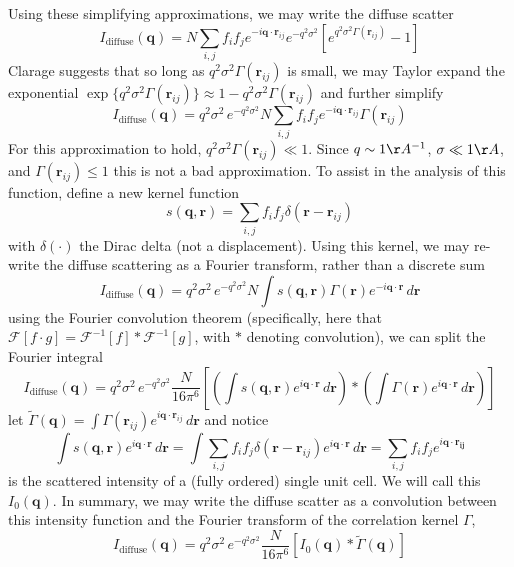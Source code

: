 \documentclass{article}
\begin{document}
Using these simplifying approximations, we may write the diffuse scatter
\[
I_\mathrm{diffuse} (\mathbf{q}) = N \sum\limits_{i,j} f_i f_j e^{-i \mathbf{q} \cdot \mathbf{r}_{ij}} 
%
e^{- q^2 \sigma^2}
%
\left[ 
e^{q^2 \sigma^2 \Gamma(\mathbf{r}_{ij})} - 1
\right]
\]
Clarage suggests that so long as $q^2 \sigma^2 \Gamma(\mathbf{r}_{ij})$ is small, we may Taylor expand the exponential $\exp \{ q^2 \sigma^2 \Gamma(\mathbf{r}_{ij}) \} \approx 1 - q^2 \sigma^2 \Gamma(\mathbf{r}_{ij})$ and further simplify
\[
I_\mathrm{diffuse} (\mathbf{q}) = q^2 \sigma^2 \, e^{- q^2 \sigma^2} N 
\sum\limits_{i,j} f_i f_j e^{-i \mathbf{q} \cdot \mathbf{r}_{ij}} \Gamma(\mathbf{r}_{ij})
\]
For this approximation to hold, $q^2 \sigma^2 \Gamma(\mathbf{r}_{ij}) \ll 1$. Since $q \sim 1 \AA^{-1}$, $\sigma \ll 1 \AA$, and $\Gamma(\mathbf{r}_{ij}) \leq 1$ this is not a bad approximation. To assist in the analysis of this function, define a new kernel function
\[
s( \mathbf{q}, \mathbf{r}) = \sum_{i,j} f_i f_j \delta( \mathbf{r} - \mathbf{r}_{ij})
\]
with $\delta(\cdot)$ the Dirac delta (not a displacement). Using this kernel, we may re-write the diffuse scattering as a Fourier transform, rather than a discrete sum
\[
I_\mathrm{diffuse} (\mathbf{q}) = q^2 \sigma^2 \, e^{- q^2 \sigma^2} N 
\int s( \mathbf{q}, \mathbf{r})  \Gamma(\mathbf{r}) e^{-i \mathbf{q} \cdot \mathbf{r}} \, d \mathbf{r}
\]
using the Fourier convolution theorem (specifically, here that $ \mathcal{F}[ f \cdot g ] = \mathcal{F}^{-1}[f] \ast \mathcal{F}^{-1}[g]$, with $\ast$ denoting convolution), we can split the Fourier integral
\[
I_\mathrm{diffuse} (\mathbf{q}) = q^2 \sigma^2 \, e^{- q^2 \sigma^2} \frac{N}{16 \pi^6} 
\left[ \left( \int s( \mathbf{q}, \mathbf{r})  e^{i \mathbf{q} \cdot \mathbf{r}} \, d \mathbf{r} \right) \ast
\left( \int \Gamma(\mathbf{r})   e^{i \mathbf{q} \cdot \mathbf{r}} \, d \mathbf{r} \right) \right]
\]
let $\tilde{\Gamma} (\mathbf{q}) = \int \Gamma(\mathbf{r}_{ij})   e^{i \mathbf{q} \cdot \mathbf{r}_{ij}} \, d \mathbf{r}$ and notice 
\[
\int s( \mathbf{q}, \mathbf{r})  e^{i \mathbf{q} \cdot \mathbf{r}} \, d \mathbf{r} =
%
\int \sum_{i,j} f_i f_j \delta( \mathbf{r} - \mathbf{r}_{ij}) e^{i \mathbf{q} \cdot \mathbf{r}}  \, d \mathbf{r} =
%
\sum_{i,j} f_i f_j e^{i \mathbf{q} \cdot \mathbf{r_{ij}}}
\]
is the scattered intensity of a (fully ordered) single unit cell. We will call this $I_0(\mathbf{q})$. In summary, we may write the diffuse scatter as a convolution between this intensity function and the Fourier transform of the correlation kernel $\Gamma$,
\begin{equation}
I_\mathrm{diffuse} (\mathbf{q}) = q^2 \sigma^2 \, e^{- q^2 \sigma^2} \frac{N}{16 \pi^6} 
\left[ I_0(\mathbf{q}) \ast \tilde{\Gamma}(\mathbf{q}) \right]
\end{equation}
\end{document}
